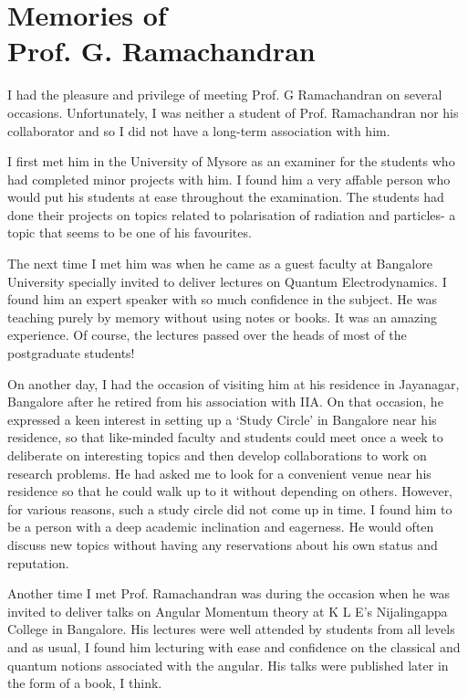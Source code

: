 \chapter[Memories of Prof. G. Ramachandran]{Memories of\\ Prof. G. Ramachandran}\label{chap7}



I had the pleasure and privilege of meeting Prof. G Ramachandran on several occasions. Unfortunately, I was neither a student of Prof. Ramachandran nor his collaborator and so I did not have a long-term association with him.


I first met him in the University of Mysore as an examiner for the students who had completed minor projects with him. I found him a very affable person who would put his students at ease throughout the examination. The students had done their projects on topics related to polarisation of radiation and particles- a topic that seems to be one of his favourites.

The next time I met him was when he came as a guest faculty at Bangalore University specially invited to deliver lectures on Quantum Electrodynamics. I found him an expert speaker with so much confidence in the subject. He was teaching purely by memory without using notes or books. It was an amazing experience. Of course, the lectures passed over the heads of most of the postgraduate students!

On another day, I had the occasion of visiting him at his residence in Jayanagar, Bangalore after he retired from his association with IIA. On that occasion, he expressed a keen interest in setting up a `Study Circle' in Bangalore near his residence, so that like-minded faculty and students could meet once a week to deliberate on interesting topics and then develop collaborations to work on research problems. He had asked me to look for a convenient venue near his residence so that he could walk up to it without depending on others. However, for various reasons, such a study circle did not come up in time. I found him to be a person with a deep academic inclination and eagerness. He would often discuss new topics without having any reservations about his own status and reputation.

Another time I met Prof. Ramachandran was during the occasion when he was invited to deliver talks on Angular Momentum theory at K L E's Nijalingappa College in Bangalore. His lectures were well attended by students from all levels and as usual, I found him lecturing with ease and confidence on the classical and quantum notions associated with the angular. His talks were published later in the form of a book, I think.

